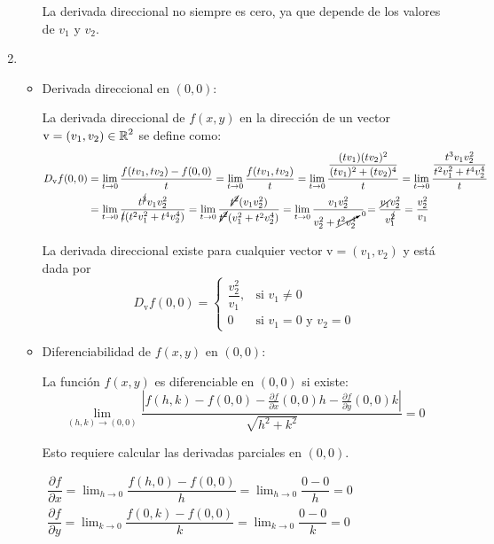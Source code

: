 \begin{enumerate}[label=\c olor{red}\textbf{\arabic*)}, leftmargin=*]
\begin{itemize}
	La derivada direccional no siempre es cero, ya que depende de los valores de $v_1$ y $v_2$.
	\end{itemize}
	
	\item {}
	
\begin{itemize}
\item Derivada direccional en $(0,0)$:

	La derivada direccional de $f(x,y)$ en la dirección de un vector $\mathrm{v}=(v_1,v_2)\in\operatorname{\mathbb{R}}^2$ se define como:
	\[ \begin{aligned}
	D_{\mathrm{v}}f(0,0)&=\lim_{t\to0}\dfrac{f(tv_1,tv_2)-f(0,0)}{t}=\lim_{t\to0}\dfrac{f(tv_1,tv_2)}{t}=\lim_{t\to0}\dfrac{\dfrac{(tv_1)(tv_2)^{2}}{(tv_1)^{2}+(tv_2)^{4}}}{t}=\lim_{t\to0}\dfrac{\dfrac{t^{3}v_1v_2^{2}}{t^2v_1^2+t^4v_2^4}}{t}\\
	&=\lim_{t\to0}\dfrac{t^{\cancel{3}}v_1v_2^2}{\cancel{t}(t^2v_1^2+t^4v_2^4)}=\lim_{t\to0}\dfrac{\cancel{t^{2}}(v_1v_2^2)}{\cancel{t^{2}}(v_1^2+t^2v_2^4)}=\lim_{t\to0}\dfrac{v_1v_2^2}{v_2^2+\cancelto{0}{t^2v_2^4}~~}=\dfrac{\cancel{v_1}v_2^2}{v_1^{\cancel{2}}}=\dfrac{v_2^2}{v_1}
	\end{aligned} \]
	
	La derivada direccional existe para cualquier vector $\mathrm{v}=(v_1,v_2)$ y está dada por \[ D_{\mathrm{v}}f(0,0)=\begin{cases}
	\dfrac{v_2^2}{v_1}, & \text{si }v_1\neq0\\
	0 & \text{si }v_1=0\text{ y }v_2=0
	\end{cases} \]
	\item Diferenciabilidad de $f(x,y)$ en $(0,0)$:
	
	La función $f(x,y)$ es diferenciable en $(0,0)$ si existe: \[ \lim_{(h,k)\to(0,0)}\dfrac{\left|f(h,k)-f(0,0)-\frac{\partial f}{\partial x}(0,0)h-\frac{\partial f}{\partial y}(0,0)k\right|}{\sqrt{h^2+k^2}}=0 \]
	
	Esto requiere calcular las derivadas parciales en $(0,0)$.
	
	$\begin{array}{l}
	\dfrac{\partial f}{\partial x}=\lim_{h\to0}\dfrac{f(h,0)- f(0,0)}{h}=\lim_{h\to0}\dfrac{0-0}{h}=0\\
	\dfrac{\partial f}{\partial y}=\lim_{k\to0}\dfrac{f(0,k)- f(0,0)}{k}=\lim_{k\to0}\dfrac{0-0}{k}=0\\
	\end{array}$
	

\end{itemize}
\end{enumerate}
